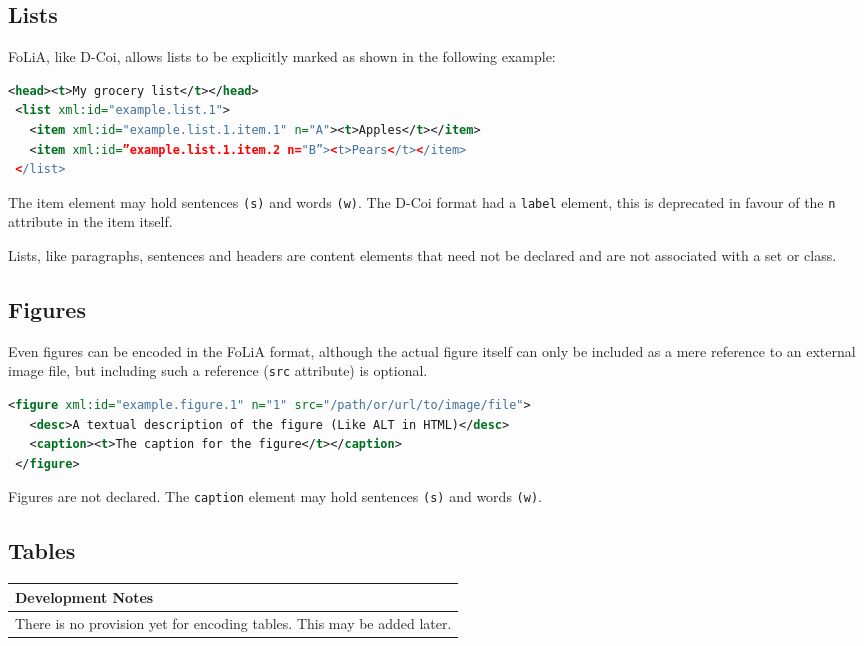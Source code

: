 \documentclass[a4paper,12pt]{report}
\newenvironment{devnotes}
{
\begin{center}
    \begin{tabular}[h!]{|p{0.8\textwidth}|}
    \hline
    {\bf Development Notes}\\\hline}
{   \\\hline
    \end{tabular}
\end{center}}
\begin{document}
\subsection{Lists}

FoLiA, like D-Coi, allows lists to be explicitly marked as shown in the following example:

\begin{lstlisting}[language=xml]
 <head><t>My grocery list</t></head>
 <list xml:id="example.list.1">
   <item xml:id="example.list.1.item.1" n="A"><t>Apples</t></item>
   <item xml:id=”example.list.1.item.2 n="B”><t>Pears</t></item>
 </list>
\end{lstlisting}

The item element may hold sentences \texttt{(s)} and words \texttt{(w)}. The D-Coi format had a \texttt{label} element, this is deprecated in favour of the \texttt{n} attribute in the item itself.

Lists, like paragraphs, sentences and headers are content elements that need not be declared and are not associated with a set or class.

\subsection{Figures}

Even figures can be encoded in the FoLiA format, although the actual figure itself can only be included as a mere reference to an external image file, but including such a reference (\texttt{src} attribute) is optional.

\begin{lstlisting}[language=xml]
 <figure xml:id="example.figure.1" n="1" src="/path/or/url/to/image/file">
   <desc>A textual description of the figure (Like ALT in HTML)</desc>
   <caption><t>The caption for the figure</t></caption>
 </figure>
\end{lstlisting}

Figures are not declared. The \texttt{caption} element may hold sentences \texttt{(s)} and words \texttt{(w)}.

\subsection{Tables}

\begin{devnotes}
There is no provision yet for encoding tables. This may be added later.
\end{devnotes}
\end{document}
